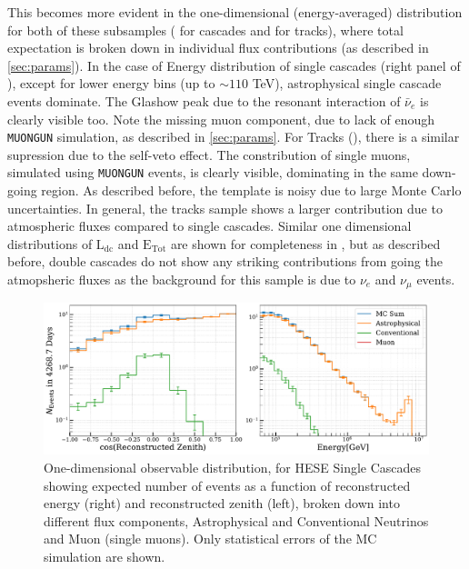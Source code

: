This becomes more evident in the one-dimensional (energy-averaged) distribution for both of these subsamples ( for cascades and  for tracks), where total expectation is broken down in individual flux contributions (as described in \ref{sec:params}). In the case of Energy distribution of single cascades (right panel of ), except for lower energy bins (up to $\sim110$ TeV), astrophysical single cascade events dominate. The Glashow peak due to the resonant interaction of $\bar{\nu}_e$ is clearly visible too. Note the missing muon component, due to lack of enough \texttt{MUONGUN} simulation, as described in \ref{sec:params}. For Tracks (), there is a similar supression due to the self-veto effect. The constribution of single muons, simulated using \texttt{MUONGUN} events, is clearly visible, dominating in the same down-going region. As described before, the template is noisy due to large Monte Carlo uncertainties. In general, the tracks sample shows a larger contribution due to atmospheric fluxes compared to single cascades. Similar one dimensional distributions of $\mathrm{L}_{\mathrm{dc}}$ and $\mathrm{E}_{\mathrm{Tot}}$ are shown for completeness in , but as described before, double cascades do not show any striking contributions from going the atmopsheric fluxes as the background for this sample is due to $\nu_{e}$ and $\nu_{\mu}$ events.


\begin{figure}[h!]
    \caption{One-dimensional observable distribution, for HESE Single Cascades showing expected number of events as a function of reconstructed energy (right) and reconstructed zenith (left), broken down into different flux components, Astrophysical and Conventional Neutrinos and Muon (single muons). Only statistical errors of the MC simulation are shown.}
    \includegraphics{./figures/Analysis/Cascades.pdf}
\end{figure}


